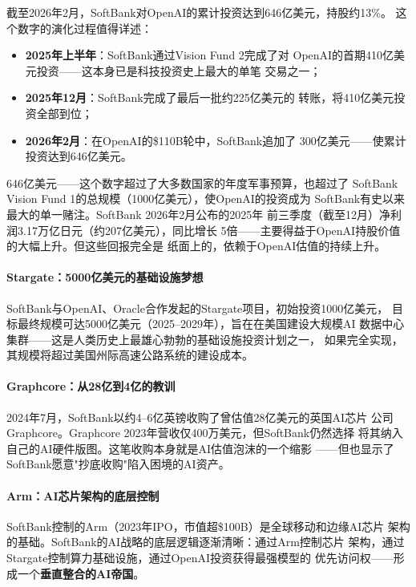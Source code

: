 截至2026年2月，SoftBank对OpenAI的累计投资达到646亿美元，持股约13\%。
这个数字的演化过程值得详述：

\begin{itemize}
  \item \textbf{2025年上半年}：SoftBank通过Vision Fund 2完成了对
    OpenAI的首期410亿美元投资——这本身已是科技投资史上最大的单笔
    交易之一；
  \item \textbf{2025年12月}：SoftBank完成了最后一批约225亿美元的
    转账，将410亿美元投资全部到位；
  \item \textbf{2026年2月}：在OpenAI的\$110B轮中，SoftBank追加了
    300亿美元——使累计投资达到646亿美元。
\end{itemize}

646亿美元——这个数字超过了大多数国家的年度军事预算，也超过了
SoftBank Vision Fund 1的总规模（1000亿美元），使OpenAI的投资成为
SoftBank有史以来最大的单一赌注。SoftBank 2026年2月公布的2025年
前三季度（截至12月）净利润3.17万亿日元（约207亿美元），同比增长
5倍——主要得益于OpenAI持股价值的大幅上升。但这些回报完全是
纸面上的，依赖于OpenAI估值的持续上升。

\paragraph{Stargate：5000亿美元的基础设施梦想}

SoftBank与OpenAI、Oracle合作发起的Stargate项目，初始投资1000亿美元，
目标最终规模可达5000亿美元（2025--2029年），旨在在美国建设大规模AI
数据中心集群——这是人类历史上最雄心勃勃的基础设施投资计划之一，
如果完全实现，其规模将超过美国州际高速公路系统的建设成本。

\paragraph{Graphcore：从28亿到4亿的教训}

2024年7月，SoftBank以约4--6亿英镑收购了曾估值28亿美元的英国AI芯片
公司Graphcore。Graphcore 2023年营收仅400万美元，但SoftBank仍然选择
将其纳入自己的AI硬件版图。这笔收购本身就是AI估值泡沫的一个缩影
——但也显示了SoftBank愿意"抄底收购"陷入困境的AI资产。

\paragraph{Arm：AI芯片架构的底层控制}

SoftBank控制的Arm（2023年IPO，市值超\$100B）是全球移动和边缘AI芯片
架构的基础。SoftBank的AI战略的底层逻辑逐渐清晰：通过Arm控制芯片
架构，通过Stargate控制算力基础设施，通过OpenAI投资获得最强模型的
优先访问权——形成一个\textbf{垂直整合的AI帝国}。

